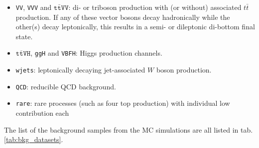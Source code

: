 \begin{itemize}
	\item[] \texttt{VV}, \texttt{VVV} and $\texttt{t}{\bar{\texttt{t}}}\texttt{VV}$: di- or triboson production with (or without) associated $t\bar{t}$ production. If any of these vector bosons decay hadronically while the other(s) decay leptonically, this results in a semi- or dileptonic di-bottom final state.
	\item[] $\texttt{t}\bar{\texttt{t}}\texttt{VH}$, \texttt{ggH} and \texttt{VBFH}: Higgs production channels.
	\item[] \texttt{wjets}: leptonically decaying jet-associated $W$ boson production.
	\item[] \texttt{QCD}: reducible QCD background.
	\item[] \texttt{rare}: rare processes (such as four top production) with individual low contribution each
\end{itemize}

The list of the background samples from the MC simulations are all listed in tab. \ref{tab:bkg_datasets}.

